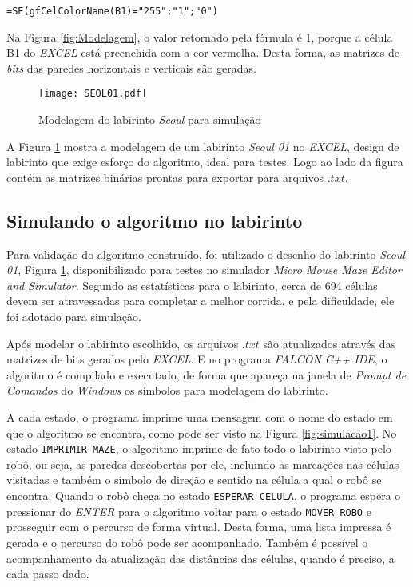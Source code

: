 \begin{verbatim}
=SE(gfCelColorName(B1)="255";"1";"0")
\end{verbatim}

Na Figura \ref{fig:Modelagem}, o valor retornado pela fórmula é 1, porque a célula B1 do \textit{EXCEL} está preenchida com a cor vermelha. Desta forma, as matrizes de \textit{bits} das paredes horizontais e verticais são geradas.

\begin{figure}[!htb]
	\caption{\label{fig:ModelagemLabirinto}Modelagem do labirinto \textit{Seoul} para simulação}
	\begin{center}
		\texttt{[image: SEOL01.pdf]}
	\end{center}
\end{figure}


A Figura \ref{fig:ModelagemLabirinto} mostra a modelagem de um labirinto \emph{Seoul 01} no \textit{EXCEL}, design de labirinto que exige esforço do algoritmo, ideal para testes. Logo ao lado da figura contém as matrizes binárias prontas para exportar para arquivos $.txt$.

\subsection{Simulando o algoritmo no labirinto}

Para validação do algoritmo construído, foi utilizado o desenho do labirinto \emph{Seoul 01}, Figura \ref{fig:ModelagemLabirinto}, disponibilizado para testes no simulador \emph{Micro Mouse Maze Editor and Simulator}. Segundo as estatísticas para o labirinto, cerca de 694 células devem ser atravessadas para completar a melhor corrida, e pela dificuldade, ele foi adotado para simulação.

Após modelar o labirinto escolhido, os arquivos $.txt$ são atualizados através das matrizes de bits gerados pelo \textit{EXCEL}. E no programa \textit{FALCON C++ IDE}, o algoritmo é compilado e executado, de forma que apareça na janela de \emph{Prompt de Comandos} do \emph{Windows} os símbolos para modelagem do labirinto. 

A cada estado, o programa imprime uma mensagem com o nome do estado em que o algoritmo se encontra, como pode ser visto na Figura \ref{fig:simulacao1}. 
No estado \texttt{IMPRIMIR MAZE}, o algoritmo imprime de fato todo o labirinto visto pelo robô, ou seja, as paredes descobertas por ele, incluindo as marcações nas células visitadas e também o símbolo de direção e sentido na célula a qual o robô se encontra. Quando o robô chega no estado \verb+ESPERAR_CELULA+, o programa espera o pressionar do \textit{ENTER} para o algoritmo voltar para o estado \verb+MOVER_ROBO+ e prosseguir com o percurso de forma virtual. Desta forma, uma lista impressa é gerada e o percurso do robô pode ser acompanhado. Também é possível o acompanhamento da atualização das distâncias das células, quando é preciso, a cada passo dado.


